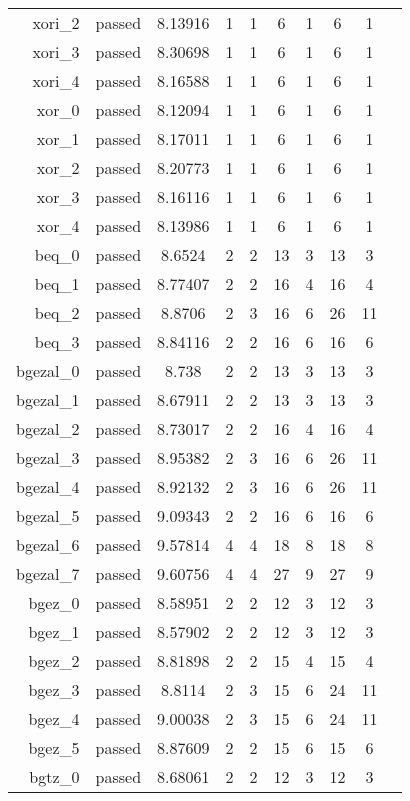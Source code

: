 \begin{longtable}{r|ccccccccc}
    xori\_2 & passed & 8.13916 & 1 & 1 & 6 & 1 & 6 & 1 \\
    xori\_3 & passed & 8.30698 & 1 & 1 & 6 & 1 & 6 & 1 \\
    xori\_4 & passed & 8.16588 & 1 & 1 & 6 & 1 & 6 & 1 \\
    xor\_0 & passed & 8.12094 & 1 & 1 & 6 & 1 & 6 & 1 \\
    xor\_1 & passed & 8.17011 & 1 & 1 & 6 & 1 & 6 & 1 \\
    xor\_2 & passed & 8.20773 & 1 & 1 & 6 & 1 & 6 & 1 \\
    xor\_3 & passed & 8.16116 & 1 & 1 & 6 & 1 & 6 & 1 \\
    xor\_4 & passed & 8.13986 & 1 & 1 & 6 & 1 & 6 & 1 \\
    beq\_0 & passed & 8.6524 & 2 & 2 & 13 & 3 & 13 & 3 \\
    beq\_1 & passed & 8.77407 & 2 & 2 & 16 & 4 & 16 & 4 \\
    beq\_2 & passed & 8.8706 & 2 & 3 & 16 & 6 & 26 & 11 \\
    beq\_3 & passed & 8.84116 & 2 & 2 & 16 & 6 & 16 & 6 \\
    bgezal\_0 & passed & 8.738 & 2 & 2 & 13 & 3 & 13 & 3 \\
    bgezal\_1 & passed & 8.67911 & 2 & 2 & 13 & 3 & 13 & 3 \\
    bgezal\_2 & passed & 8.73017 & 2 & 2 & 16 & 4 & 16 & 4 \\
    bgezal\_3 & passed & 8.95382 & 2 & 3 & 16 & 6 & 26 & 11 \\
    bgezal\_4 & passed & 8.92132 & 2 & 3 & 16 & 6 & 26 & 11 \\
    bgezal\_5 & passed & 9.09343 & 2 & 2 & 16 & 6 & 16 & 6 \\
    bgezal\_6 & passed & 9.57814 & 4 & 4 & 18 & 8 & 18 & 8 \\
    bgezal\_7 & passed & 9.60756 & 4 & 4 & 27 & 9 & 27 & 9 \\
    bgez\_0 & passed & 8.58951 & 2 & 2 & 12 & 3 & 12 & 3 \\
    bgez\_1 & passed & 8.57902 & 2 & 2 & 12 & 3 & 12 & 3 \\
    bgez\_2 & passed & 8.81898 & 2 & 2 & 15 & 4 & 15 & 4 \\
    bgez\_3 & passed & 8.8114 & 2 & 3 & 15 & 6 & 24 & 11 \\
    bgez\_4 & passed & 9.00038 & 2 & 3 & 15 & 6 & 24 & 11 \\
    bgez\_5 & passed & 8.87609 & 2 & 2 & 15 & 6 & 15 & 6 \\
    bgtz\_0 & passed & 8.68061 & 2 & 2 & 12 & 3 & 12 & 3 \\

\end{longtable}

